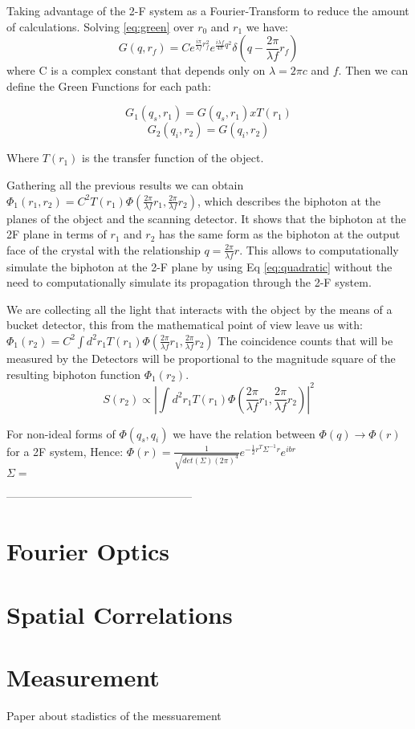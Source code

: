 Taking advantage of the 2-F system as a Fourier-Transform to reduce the amount of calculations. Solving \ref{eq:green} over $r_0$ and $r_1$ we have:
\begin{equation}
G(q,r_f)=C e^{\frac{i \pi}{\lambda f} r_f^2} e^{\frac{i \lambda f}{4 \pi} q^2} \delta ( q - \frac{2 \pi}{\lambda f}r_f)
\end{equation}
where C is a complex constant that depends only on $\lambda = 2\pi c$ and $f$. Then we can define the Green Functions for each path:

\begin{equation}
G_1(q_s,r_1)=G(q_s,r_1) x T(r_1) 
\end{equation}
\begin{equation}
G_2(q_i,r_2)=G(q_i,r_2)
\end{equation}

Where $T(r_1)$ is the transfer function of the object.

Gathering all the previous results we can obtain $\Phi_1 (r_1 , r_2 )=C^2 T(r_1) \Phi (\frac{2 \pi}{\lambda f}r_1, \frac{2 \pi}{\lambda f}r_2)$, which describes the biphoton at the planes of the object and the scanning detector. It shows that the biphoton at the 2F plane in terms of
$r_1$ and $r_2$  has the same form as the biphoton at the
output face of the crystal with the relationship $q = \frac{2 \pi}{\lambda f} r$.
This allows to computationally simulate the biphoton at the 2-F plane by using Eq \ref{eq:quadratic} without the need to computationally simulate its propagation through the 2-F system.

We are collecting all the light that interacts with the object by the means of a bucket detector, this from the mathematical point of view leave us with: 
 $\Phi_1 (r_2) = C^2 \int d^2 r_1 T(r_1) \Phi (\frac{2 \pi}{\lambda f}r_1, \frac{2 \pi}{\lambda f}r_2)$ 
The coincidence counts that will be measured by the Detectors will be proportional to the magnitude square of the resulting biphoton function $\Phi_1 (r_2)$.
\begin{equation}
S(r_2) \propto |  \int d^2 r_1 T(r_1) \Phi (\frac{2 \pi}{\lambda f}r_1, \frac{2 \pi}{\lambda f}r_2) |^2
\end{equation}

For non-ideal forms of $\Phi (q_s,q_i)$ we have the relation between $\Phi (q) \rightarrow \Phi (r)$ for a 2F system, Hence: $\Phi(r)=\frac{1}{\sqrt{det(\Sigma)(2 \pi)^4}} e^{- \frac{1}{2} r^T \Sigma^{-1} r} e^{ibr}$ \\
$\Sigma=$


--------------------------------------------------
\section{Fourier Optics}
\section{Spatial Correlations}

\section{Measurement}
Paper about stadistics of the messuarement\cite{opticalComunications} 
